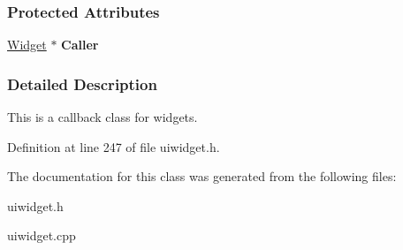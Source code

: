 \subsubsection*{Protected Attributes}
\begin{DoxyCompactItemize}
\item 
\hypertarget{classMezzanine_1_1UI_1_1WidgetCallback_a44825154b17a4b800b3991b0c593e034}{
\hyperlink{classMezzanine_1_1UI_1_1Widget}{Widget} $\ast$ {\bfseries Caller}}
\label{classMezzanine_1_1UI_1_1WidgetCallback_a44825154b17a4b800b3991b0c593e034}

\end{DoxyCompactItemize}


\subsubsection{Detailed Description}
This is a callback class for widgets. 

Definition at line 247 of file uiwidget.h.



The documentation for this class was generated from the following files:\begin{DoxyCompactItemize}
\item 
uiwidget.h\item 
uiwidget.cpp\end{DoxyCompactItemize}
